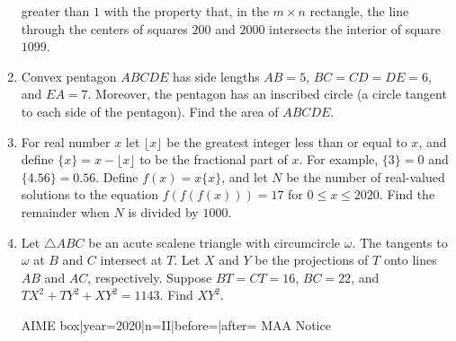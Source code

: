 \documentclass{article}
\begin{document}
\begin{enumerate}[label=\arabic*., itemsep=0.5em]
greater than \(1\) with the property that, in the \(m\times n\) rectangle, the line through the centers of squares \(200\) and \(2000\) intersects the interior of square \(1099\).\par \vspace{0.5em}\item Convex pentagon \(ABCDE\) has side lengths \(AB=5\), \(BC=CD=DE=6\), and \(EA=7\). Moreover, the pentagon has an inscribed circle (a circle tangent to each side of the pentagon). Find the area of \(ABCDE\).\par \vspace{0.5em}\item For real number \(x\) let \(\lfloor x\rfloor\) be the greatest integer less than or equal to \(x\), and define \(\{x\} = x - \lfloor x \rfloor\) to be the fractional part of \(x\). For example, \(\{3\} = 0\) and \(\{4.56\} = 0.56\). Define \(f(x)=x\{x\}\), and let \(N\) be the number of real-valued solutions to the equation \(f(f(f(x)))=17\) for \(0\leq x\leq 2020\). Find the remainder when \(N\) is divided by \(1000\).\par \vspace{0.5em}\item Let \(\triangle ABC\) be an acute scalene triangle with circumcircle \(\omega\). The tangents to \(\omega\) at \(B\) and \(C\) intersect at \(T\). Let \(X\) and \(Y\) be the projections of \(T\) onto lines \(AB\) and \(AC\), respectively. Suppose \(BT = CT = 16\), \(BC = 22\), and \(TX^2 + TY^2 + XY^2 = 1143\). Find \(XY^2\).



{{AIME box|year=2020|n=II|before=|after=}}
{{MAA Notice}}\par \vspace{0.5em}\end{enumerate}
\end{document}
